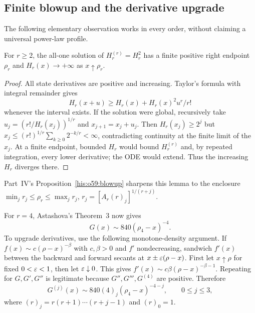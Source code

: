 \subsection{Finite blowup and the derivative upgrade}
The following elementary observation works in every order, without claiming a universal power-law profile.
\begin{lemma}\label{his:lem:allblowup}
For $r\ge2$, the all-one solution of $H_r^{(r)}=H_r^2$ has a finite positive right endpoint $\rho_r$ and $H_r(x)\to+\infty$ as $x\uparrow\rho_r$.
\end{lemma}
\begin{proof}
All state derivatives are positive and increasing. Taylor's formula with integral remainder gives
\[
 H_r(x+u)\ge H_r(x)+H_r(x)^2u^r/r!
\]
whenever the interval exists. If the solution were global, recursively take
$u_j=(r!/H_r(x_j))^{1/r}$ and $x_{j+1}=x_j+u_j$. Then $H_r(x_j)\ge2^j$ but
$x_j\le(r!)^{1/r}\sum_{k\ge0}2^{-k/r}<\infty$, contradicting continuity at the finite limit of the $x_j$. At a finite endpoint, bounded $H_r$ would bound $H_r^{(r)}$ and, by repeated integration, every lower derivative; the ODE would extend. Thus the increasing $H_r$ diverges there.
\end{proof}
\begin{writenote}
Part~IV's Proposition~\ref{his:o59:blowup} sharpens this lemma to the enclosure $\min_jr_j\le\rho_r\le\max_jr_j$, $r_j=[A_r(r)_j]^{1/(r+j)}$.
\end{writenote}

For $r=4$, Astashova's Theorem~3 \cite{astashova2013} now gives
\begin{equation}\label{his:eq:r4real}
 G(x)\sim840(\rho_4-x)^{-4}.
\end{equation}
To upgrade derivatives, use the following monotone-density argument. If
$f(x)\sim c(\rho-x)^{-\beta}$ with $c,\beta>0$ and $f'$ nondecreasing, sandwich $f'(x)$ between the backward and forward secants at $x\pm\varepsilon(\rho-x)$. First let $x\uparrow\rho$ for fixed $0<\varepsilon<1$, then let $\varepsilon\downarrow0$. This gives $f'(x)\sim c\beta(\rho-x)^{-\beta-1}$. Repeating for $G,G',G''$ is legitimate because $G'',G''',G^{(4)}$ are positive. Therefore
\begin{equation}\label{his:eq:r4derivatives}
 G^{(j)}(x)\sim840(4)_j(\rho_4-x)^{-4-j},\qquad 0\le j\le3,
\end{equation}
where $(r)_j=r(r+1)\cdots(r+j-1)$ and $(r)_0=1$.

